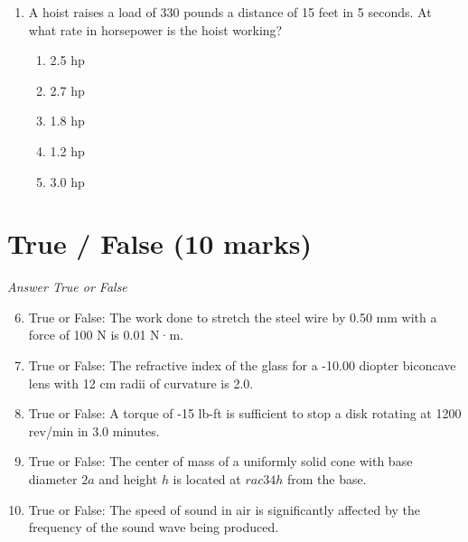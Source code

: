\documentclass[12pt]{article}
\begin{document}
\begin{enumerate}[label=\arabic*.]
\begin{enumerate}[label=(\alph*)]
    \item 4 mm
    \item .833 mm
    \item 1 mm
    \item 1.5 mm
    \item 0.5 mm
\end{enumerate}
\item A hoist raises a load of 330 pounds a distance of 15 feet in 5 seconds. At what rate in horsepower is the hoist working?
\begin{enumerate}[label=(\alph*)]
    \item 2.5 hp
    \item 2.7 hp
    \item 1.8 hp
    \item 1.2 hp
    \item 3.0 hp
\end{enumerate}
\end{enumerate}

\section*{True / False (10 marks)}
\textit{Answer True or False}
\begin{enumerate}[label=\arabic*.]
\setcounter{enumi}{5}
\item True or False: The work done to stretch the steel wire by 0.50 mm with a force of 100 N is 0.01 N·m.
\item True or False: The refractive index of the glass for a -10.00 diopter biconcave lens with 12 cm radii of curvature is 2.0.
\item True or False: A torque of -15 lb-ft is sufficient to stop a disk rotating at 1200 rev/min in 3.0 minutes.
\item True or False: The center of mass of a uniformly solid cone with base diameter $2 a$ and height $h$ is located at $rac{3}{4}h$ from the base.
\item True or False: The speed of sound in air is significantly affected by the frequency of the sound wave being produced.
\end{enumerate}
\end{document}
